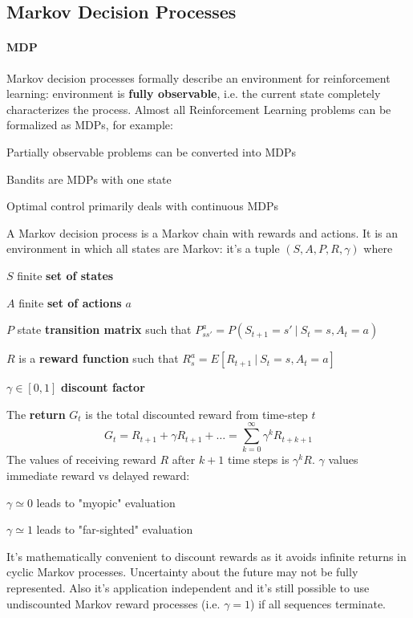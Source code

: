 \documentclass[10pt]{report}
\begin{document}
\subsection{Markov Decision Processes}
\paragraph{MDP} Markov decision processes formally describe an environment for reinforcement learning: environment is \textbf{fully observable}, i.e. the current state completely characterizes the process. Almost all Reinforcement Learning problems can be formalized as MDPs, for example:
\begin{list}{}{}
	\item Partially observable problems can be converted into MDPs
	\item Bandits are MDPs with one state
	\item Optimal control primarily deals with continuous MDPs
\end{list}
A Markov decision process is a Markov chain with rewards and actions. It is an environment in which all states are Markov: it's a tuple $(S, A, P, R, \gamma)$ where\begin{list}{}{}
	\item $S$ finite \textbf{set of states}
	\item $A$ finite \textbf{set of actions} $a$
	\item $P$ state \textbf{transition matrix} such that $P_{ss'}^a = P(S_{t+1}=s'\:|\:S_t=s, A_t=a)$
	\item $R$ is a \textbf{reward function} such that $R_s^a = E[R_{t+1}\:|\:S_t=s,A_t=a]$
	\item $\gamma\in [0,1]$ \textbf{discount factor}
\end{list}
The \textbf{return} $G_t$ is the total discounted reward from time-step $t$
$$G_t = R_{t+1} + \gamma R_{t+1}+\ldots = \sum_{k=0}^\infty \gamma^kR_{t+k+1}$$
The values of receiving reward $R$ after $k+1$ time steps is $\gamma^k R$. $\gamma$ values immediate reward vs delayed reward:
\begin{list}{}{}
	\item $\gamma\simeq 0$ leads to "myopic" evaluation
	\item $\gamma\simeq 1$ leads to "far-sighted" evaluation
\end{list}
It's mathematically convenient to discount rewards as it avoids infinite returns in cyclic Markov processes. Uncertainty about the future may not be fully represented. Also it's application independent and it's still possible to use undiscounted Markov reward processes (i.e. $\gamma=1$) if all sequences terminate.\\
\end{document}
